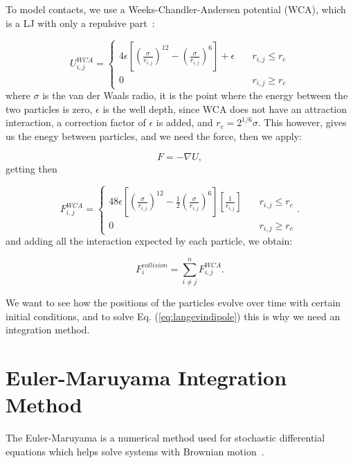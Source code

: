 To model contacts, we use a Weeks-Chandler-Andersen potential (WCA), which is a LJ with only a repulsive part~\cite{hess1999augmented}:

\begin{equation}
  U_{i,j}^{WCA} = \begin{cases} 
    4\epsilon\left[ \left( \frac{\sigma}{r_{i,j}}\right)^{12} - \left( \frac{\sigma}{r_{i,j}}\right)^6\right] + \epsilon \quad &r_{i,j} \leq r_c \\
    0 \quad & r_{i,j} \geq r_c
  \end{cases}
  \label{eq:wcapotential}
\end{equation}
where $\sigma$ is the van der Waals radio, it is the point where the energy between the two particles is zero, $\epsilon$ is the well depth, since WCA does not have an attraction interaction, a correction factor of $\epsilon$ is added, and $r_c = 2^{1/6}\sigma$. This however, gives us the enegy between particles, and we need the force, then we apply:

\begin{equation}
 F = - \nabla U, 
  \label{eq:negativegradient}
\end{equation}
getting then

\begin{equation}
  F_{i,j}^{WCA} = \begin{cases} 
    48\epsilon\left[ \left( \frac{\sigma}{r_{i,j}}\right)^{12} - \frac{1}{2}\left( \frac{\sigma}{r_{i,j}}\right)^6\right]\left[ \frac{1}{r_{i,j}}\right] \quad &r_{i,j} \leq r_c \\
    0 \quad & r_{i,j} \geq r_c
  \end{cases}.
  \label{eq:wcaforce}
\end{equation}
and adding all the interaction expected by each particle, we obtain:

\begin{equation}
  F^{collision}_i = \sum^{n}_{i \neq j} F^{WCA}_{i,j}.  
  \label{eq:wcasum}
\end{equation}

We want to see how the positions of the particles evolve over time with certain initial conditions, and to solve Eq. (\ref{eq:langevindipole}) this is why we need an integration method.

\section{Euler-Maruyama Integration Method}
The Euler-Maruyama is a numerical method used for stochastic differential equations which helps solve systems with Brownian motion~\cite{platen2010numerical,higham2001algorithmic}.

